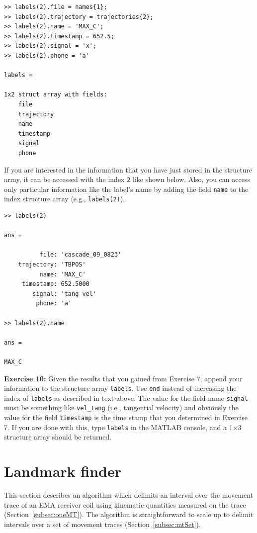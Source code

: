 \documentclass[a4paper, 12pt]{article}
\begin{document}
\begin{verbatim}
>> labels(2).file = names{1};
>> labels(2).trajectory = trajectories{2};
>> labels(2).name = 'MAX_C';
>> labels(2).timestamp = 652.5;
>> labels(2).signal = 'x';
>> labels(2).phone = 'a'

labels = 

1x2 struct array with fields:
    file
    trajectory
    name
    timestamp
    signal
    phone
\end{verbatim}

If you are interested in the information that you have just stored in the structure array, it can be accessed with the index \texttt{2} like shown below. Also, you can access only particular information like the label's name by adding the field \texttt{name} to the index structure array (e.g., \texttt{labels(2)}).

\begin{verbatim}
>> labels(2)

ans = 

          file: 'cascade_09_0823'
    trajectory: 'TBPOS'
          name: 'MAX_C'
     timestamp: 652.5000
        signal: 'tang vel'
         phone: 'a'
         
>> labels(2).name

ans =

MAX_C         
\end{verbatim}


\noindent\textbf{Exercise 10:} Given the results that you gained from Exercise 7, append your information to the structure array \texttt{labels}. Use \texttt{end} instead of increasing the index of \texttt{labels} as described in text above. The value for the field name \texttt{signal} must be something like \texttt{vel\_tang} (i.e., tangential velocity) and obviously the value for the field \texttt{timestamp} is the time stamp that you determined in Exercise 7. If you are done with this, type \texttt{labels} in the MATLAB console, and a 1$\times$3 structure array should be returned.\par\smallskip

\section{Landmark finder}

This section describes an algorithm which delimits an interval over the movement trace of an EMA receiver coil using kinematic quantities measured on the trace (Section~\ref{subsec:oneMT}). The algorithm is straightforward to scale up to delimit intervals over a set of movement traces (Section~\ref{subsec:mtSet}).
\end{document}
